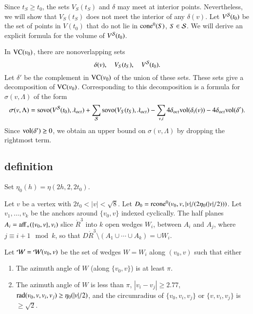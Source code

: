 Since $t_S\ge t_0$, the sets $V_S(t_S)$ and $\delta$ may meet at
interior points. Nevertheless, we will show that $V_S(t_S)$ does
not meet the interior of any $\delta(v)$.  Let $V^{{\mathcal S}}(t_0)$ be
the set of points in $V(t_0)$ that do not lie in ${\operatorname{cone}}^0(S)$,
$S\in{\mathcal S}$. We will derive an explicit formula for the volume of
$V^{{\mathcal S}}(t_0)$.

In ${\operatorname{VC}}(v_0)$, there are nonoverlapping sets
$$\delta(v),\quad   V_S(t_S),\quad V^{{\mathcal S}}(t_0).$$
Let $\delta'$ be the complement in ${\operatorname{VC}}(v_0)$ of the union of
these sets. These sets give a decomposition of ${\operatorname{VC}}(v_0)$.
Corresponding to this decomposition is a formula for $\sigma(v,\Lambda)$
of the form
    $$
    \sigma(v,\Lambda) =
        {\operatorname{sovo}}(V^{{\mathcal S}}(t_0),\lambda_{oct})
        + \sum_{{\mathcal S}}{\operatorname{sovo}}(V_S(t_S),\lambda_{oct})
        -\sum_{v,i} 4\delta_{oct}{\operatorname{vol}}(\delta_i(v))
        -4\delta_{oct}{\operatorname{vol}}(\delta').
    $$
Since ${\operatorname{vol}}(\delta')\ge0$, we obtain an upper bound on
$\sigma(v,\Lambda)$ by dropping the rightmost term.



\subsection{definition}%
    \label{sec:deltaP}



\begin{definition}\label{def:eta0}
Set $\eta_0(h)=\eta(2h,2,2t_0)$.
\end{definition}




Let $v$ be a vertex with $2t_0 < |v| <\sqrt8$.
Let $D_0 = {\operatorname{rcone}}^0(v_0,v,|v|/(2\eta_0(|v|/2)))$.
Let $v_1,\ldots,v_k$ be the anchors around $\{v_0,v\}$ indexed
cyclically. The half planes $A_i={\operatorname{aff}}_+(\{v_0,v\},v_i)$
slice $\ring{R}^3$ into $k$ open wedges
$W_i$, between
    $A_i$ and $A_j$,
where $j\equiv i+1\mod k$, so that
    $D\ring{R}^3\setminus (A_1\cup\cdots\cup A_k) =\cup W_i$.

\begin{definition}\label{def:wedge}
Let ${\mathcal W}={\mathcal W}(v_0,v)$ be the set of wedges $W=W_i$ along $(v_0,v)$ 
such that either
\begin{enumerate}
    \item The azimuth angle of $W$ (along $\{v_0,v\}$) is at least $\pi$.
    \item The azimuth angle of $W$ is less than $\pi$, 
 $|v_i-v_j|\ge 2.77$,
    $\operatorname{rad}(v_0,v,v_i,v_j)\ge\eta_0(|v|/2)$, and the
    circumradius of $\{v_0,v_i,v_j\}$ or $\{v,v_i,v_j\}$ is
    $\ge\sqrt2$.
    \label{enum:wedge2}
\end{enumerate}
\end{definition}

